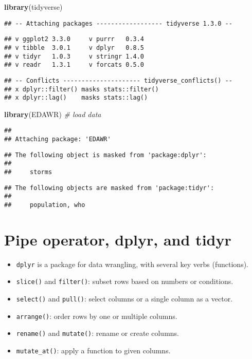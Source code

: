 \documentclass[]{article}
\newenvironment{Shaded}{\begin{snugshade}}{\end{snugshade}}
\newcommand{\CommentTok}[1]{\textcolor[rgb]{0.56,0.35,0.01}{\textit{#1}}}
\newcommand{\KeywordTok}[1]{\textcolor[rgb]{0.13,0.29,0.53}{\textbf{#1}}}
\newcommand{\NormalTok}[1]{#1}
\begin{document}
\begin{Shaded}
\begin{Highlighting}[]
\KeywordTok{library}\NormalTok{(tidyverse)}
\end{Highlighting}
\end{Shaded}

\begin{verbatim}
## -- Attaching packages ------------------ tidyverse 1.3.0 --
\end{verbatim}

\begin{verbatim}
## v ggplot2 3.3.0     v purrr   0.3.4
## v tibble  3.0.1     v dplyr   0.8.5
## v tidyr   1.0.3     v stringr 1.4.0
## v readr   1.3.1     v forcats 0.5.0
\end{verbatim}

\begin{verbatim}
## -- Conflicts --------------------- tidyverse_conflicts() --
## x dplyr::filter() masks stats::filter()
## x dplyr::lag()    masks stats::lag()
\end{verbatim}

\begin{Shaded}
\begin{Highlighting}[]
\KeywordTok{library}\NormalTok{(EDAWR) }\CommentTok{# load data}
\end{Highlighting}
\end{Shaded}

\begin{verbatim}
## 
## Attaching package: 'EDAWR'
\end{verbatim}

\begin{verbatim}
## The following object is masked from 'package:dplyr':
## 
##     storms
\end{verbatim}

\begin{verbatim}
## The following objects are masked from 'package:tidyr':
## 
##     population, who
\end{verbatim}

\hypertarget{pipe-operator-dplyr-and-tidyr}{%
\section{Pipe operator, dplyr, and
tidyr}\label{pipe-operator-dplyr-and-tidyr}}

\begin{itemize}
\item
  \texttt{dplyr} is a package for data wrangling, with several key verbs
  (functions).
\item
  \texttt{slice()} and \texttt{filter()}: subset rows based on numbers
  or conditions.
\item
  \texttt{select()} and \texttt{pull()}: select columns or a single
  column as a vector.
\item
  \texttt{arrange()}: order rows by one or multiple columns.
\item
  \texttt{rename()} and \texttt{mutate()}: rename or create columns.
\item
  \texttt{mutate\_at()}: apply a function to given columns.
\end{itemize}
\end{document}
